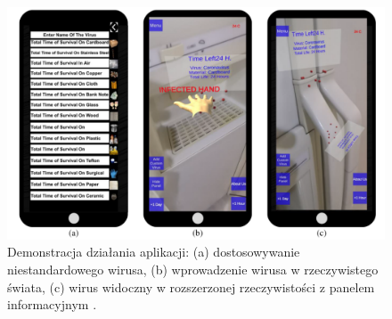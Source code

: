 \begin{figure}[h!]
	\includegraphics[width=\linewidth]{VirusIn3DSpaces.png}
	\caption{Demonstracja działania aplikacji: (a) dostosowywanie niestandardowego wirusa, (b) wprowadzenie wirusa w rzeczywistego świata, (c) wirus widoczny w rozszerzonej rzeczywistości z panelem informacyjnym \cite{bib:artykul2}.}
\end{figure}




